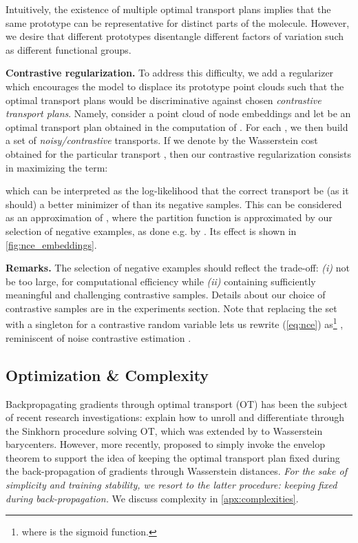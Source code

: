 \documentclass[letterpaper]{article} \usepackage{aaai22}  \usepackage{times}  \usepackage{helvet}  \usepackage{courier}  \usepackage[hyphens]{url}  \usepackage{graphicx} \urlstyle{rm} \def\UrlFont{\rm}  \usepackage{natbib}  \usepackage{caption} \DeclareCaptionStyle{ruled}{labelfont=normalfont,labelsep=colon,strut=off} \frenchspacing  \setlength{\pdfpagewidth}{8.5in}  \setlength{\pdfpageheight}{11in}  \usepackage{algorithm}
\begin{document}
Intuitively, the existence of multiple optimal transport plans implies that the same prototype can be representative for distinct parts of the molecule. However, we desire that different prototypes disentangle different factors of variation such as different functional groups.


\textbf{Contrastive regularization. } To address this difficulty, we add a regularizer which encourages the model to displace its prototype point clouds such that the optimal transport plans would be discriminative against chosen \textit{contrastive transport plans}. Namely, consider a point cloud  of node embeddings and let  be an optimal transport plan obtained in the computation of . For each , we then build a set  of \textit{noisy/contrastive} transports. If we denote by  the Wasserstein cost obtained for the particular transport , then our contrastive regularization consists in maximizing the term:

which can be interpreted as the log-likelihood that the correct transport  be (as it should) a better minimizer of  than its negative samples. This can be considered as an approximation of , where the partition function is approximated by our selection of negative examples, as done e.g. by \cite{nickel2017poincare}. Its effect is shown in \cref{fig:nce_embeddings}.

\textbf{Remarks. } The selection of negative examples should reflect the trade-off: \textit{(i)} not be too large, for computational efficiency while \textit{(ii)} containing sufficiently meaningful and challenging contrastive samples. Details about our choice of contrastive samples are in the experiments section. Note that replacing the set  with a singleton  for a contrastive random variable  lets us rewrite (\cref{eq:nce}) as\footnote{where  is the sigmoid function.} , reminiscent of noise contrastive estimation \citep{gutmann2010noise}.


\subsection{Optimization \& Complexity}\label{sec:opt}
Backpropagating gradients through optimal transport (OT) has been the subject of recent research investigations: \cite{genevay2017learning} explain how to unroll and differentiate through the Sinkhorn procedure solving OT, which was extended by \cite{schmitz2018wasserstein} to Wasserstein barycenters. However, more recently,  \cite{xu2019gromovfactor} proposed to simply invoke the envelop theorem \citep{afriat1971theory} to support the idea of keeping the optimal transport plan fixed during the back-propagation of gradients through Wasserstein distances. \textit{For the sake of simplicity and training stability, we resort to the latter procedure: keeping  fixed during back-propagation.} We discuss complexity in \cref{apx:complexities}. 
\end{document}

